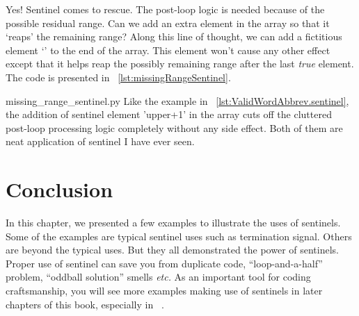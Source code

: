 Yes!
Sentinel comes to rescue.
The post-loop logic is needed because of the possible residual range.
Can we add an extra element in the array so that it `reaps' the remaining range?
Along this line of thought, we can add a fictitious element `' to the end of the
array.
This element won't cause any other effect except that it helps reap the possibly remaining range
after the last \emph{true} element.
The code is presented in ~\autoref{lst:missingRangeSentinel}.

{missing_range_sentinel.py}
Like the example in ~\autoref{lst:ValidWordAbbrev.sentinel},
the addition of sentinel element 'upper+1' in the array cuts off the cluttered
post-loop processing logic completely without any side effect.
Both of them are neat application of sentinel I have ever seen.

\section{Conclusion}

In this chapter, we presented a few examples to illustrate the uses of sentinels.
Some of the examples are typical sentinel uses such as termination signal.
Others are beyond the typical uses.
But they all demonstrated the power of sentinels.
Proper use of sentinel can save you from duplicate code, ``loop-and-a-half'' problem,
``oddball solution'' smells \textit{etc.}
As an important tool for coding craftsmanship, you will see more examples making use of
sentinels in later chapters of this book, especially in ~.
